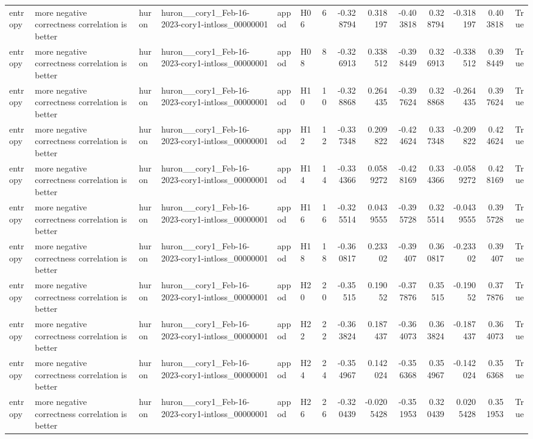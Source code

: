 \begin{longtable}{llllllrrrrrrrr}
entropy & more negative correctness correlation is better & huron & huron\_\_cory1\_Feb-16-2023-cory1-intloss\_00000001 & appod & H06 & 6 & -0.328794 & 0.318197 & -0.403818 & 0.328794 & -0.318197 & 0.403818 & True \\
entropy & more negative correctness correlation is better & huron & huron\_\_cory1\_Feb-16-2023-cory1-intloss\_00000001 & appod & H08 & 8 & -0.326913 & 0.338512 & -0.398449 & 0.326913 & -0.338512 & 0.398449 & True \\
entropy & more negative correctness correlation is better & huron & huron\_\_cory1\_Feb-16-2023-cory1-intloss\_00000001 & appod & H10 & 10 & -0.328868 & 0.264435 & -0.397624 & 0.328868 & -0.264435 & 0.397624 & True \\
entropy & more negative correctness correlation is better & huron & huron\_\_cory1\_Feb-16-2023-cory1-intloss\_00000001 & appod & H12 & 12 & -0.337348 & 0.209822 & -0.424624 & 0.337348 & -0.209822 & 0.424624 & True \\
entropy & more negative correctness correlation is better & huron & huron\_\_cory1\_Feb-16-2023-cory1-intloss\_00000001 & appod & H14 & 14 & -0.334366 & 0.0589272 & -0.428169 & 0.334366 & -0.0589272 & 0.428169 & True \\
entropy & more negative correctness correlation is better & huron & huron\_\_cory1\_Feb-16-2023-cory1-intloss\_00000001 & appod & H16 & 16 & -0.325514 & 0.0439555 & -0.395728 & 0.325514 & -0.0439555 & 0.395728 & True \\
entropy & more negative correctness correlation is better & huron & huron\_\_cory1\_Feb-16-2023-cory1-intloss\_00000001 & appod & H18 & 18 & -0.360817 & 0.23302 & -0.39407 & 0.360817 & -0.23302 & 0.39407 & True \\
entropy & more negative correctness correlation is better & huron & huron\_\_cory1\_Feb-16-2023-cory1-intloss\_00000001 & appod & H20 & 20 & -0.35515 & 0.19052 & -0.377876 & 0.35515 & -0.19052 & 0.377876 & True \\
entropy & more negative correctness correlation is better & huron & huron\_\_cory1\_Feb-16-2023-cory1-intloss\_00000001 & appod & H22 & 22 & -0.363824 & 0.187437 & -0.364073 & 0.363824 & -0.187437 & 0.364073 & True \\
entropy & more negative correctness correlation is better & huron & huron\_\_cory1\_Feb-16-2023-cory1-intloss\_00000001 & appod & H24 & 24 & -0.354967 & 0.142024 & -0.356368 & 0.354967 & -0.142024 & 0.356368 & True \\
entropy & more negative correctness correlation is better & huron & huron\_\_cory1\_Feb-16-2023-cory1-intloss\_00000001 & appod & H26 & 26 & -0.320439 & -0.0205428 & -0.351953 & 0.320439 & 0.0205428 & 0.351953 & True \\

\end{longtable}
